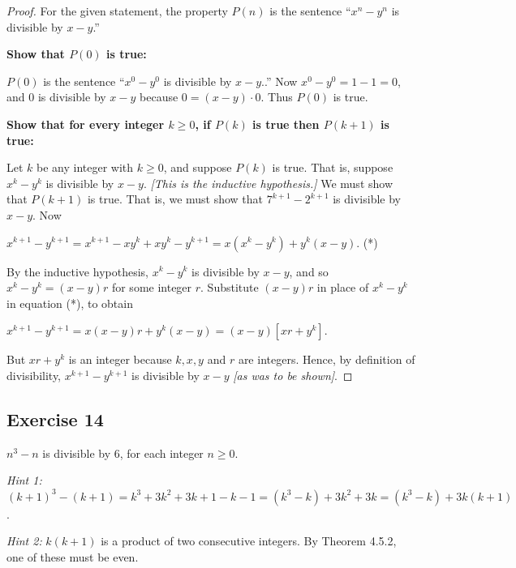 \documentclass[14pt]{extarticle}
\begin{document}
\begin{proof}
For the given statement, the property $P(n)$ is the sentence “$x^n - y^n$ is divisible by $x - y$.” 

{\bf Show that $P(0)$ is true:} 

$P(0)$ is the sentence “$x^0 - y^0$ is divisible by $x - y$..” Now $x^0 - y^0 = 1 - 1 = 0$, and 0 is divisible by $x - y$ because $0 = (x-y) \cdot 0$. Thus $P(0)$ is true. 

{\bf Show that for every integer $k \geq 0$, if $P(k)$ is true then $P(k + 1)$ is true:} 

Let $k$ be any integer with $k \geq 0$, and suppose $P(k)$ is true. That is, suppose $x^k - y^k$ is divisible by $x-y$. {\it [This is the inductive hypothesis.]} We must show that $P(k + 1)$ is true. That is, we must show that $7^{k+1} - 2^{k+1}$ is divisible by $x-y$. Now 

$x^{k+1} - y^{k+1} = x^{k+1} - xy^k + xy^k - y^{k+1} = x(x^k - y^k) + y^k(x-y)$. (*) 

By the inductive hypothesis, $x^k - y^k$ is divisible by $x-y$, and so $x^k - y^k = (x-y)r$ for some integer $r$. Substitute $(x-y)r$ in place of $x^k - y^k$ in equation (*), to obtain 

$x^{k+1} - y^{k+1} = x(x - y)r + y^k(x-y) = (x-y)[xr + y^k]$. 

But $xr + y^k$ is an integer because $k, x, y$ and $r$ are integers. Hence, by definition of divisibility, $x^{k+1} - y^{k+1}$ is divisible by $x - y$ {\it [as was to be shown]}.
\end{proof}

\subsection{Exercise 14}
$n^3 - n$ is divisible by 6, for each integer $n \geq 0$.

{\it Hint 1:} $(k + 1)^3 - (k + 1) = k^3 + 3k^2 + 3k + 1 - k - 1 = (k^3 - k) + 3k^2 + 3k = (k^3 - k) + 3k(k + 1)$.

{\it Hint 2:} $k(k + 1)$ is a product of two consecutive integers. By Theorem 4.5.2, one of these must be even.
\end{document}

